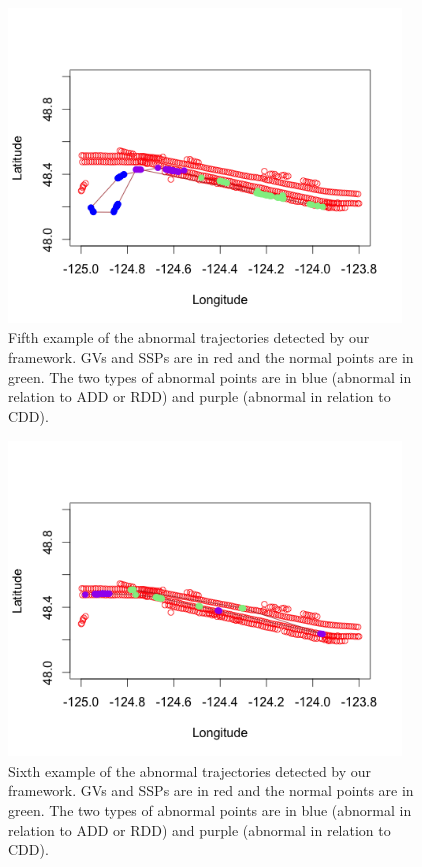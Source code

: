\documentclass[12pt,glossary]{dalcsthesis}
\begin{document}
\begin{figure}[!hp]
\centering
\includegraphics[width=4.1in, height=3.3in]{p5.png}
\caption{Fifth example of the abnormal trajectories detected by our framework. GVs and SSPs are in red and the normal points are in green. The two types of abnormal points are in blue (abnormal in relation to ADD or RDD) and purple (abnormal in relation to CDD).}
\label{fig:anomalydetection_tra5}
\end{figure}

\begin{figure}[!htp]
\centering
\includegraphics[width=4.1in, height=3.3in]{p6.png}
\caption{Sixth example of the abnormal trajectories detected by our framework. GVs and SSPs are in red and the normal points are in green. The two types of abnormal points are in blue (abnormal in relation to ADD or RDD) and purple (abnormal in relation to CDD).}
\label{fig:anomalydetection_tra6}
\end{figure}
\end{document}
